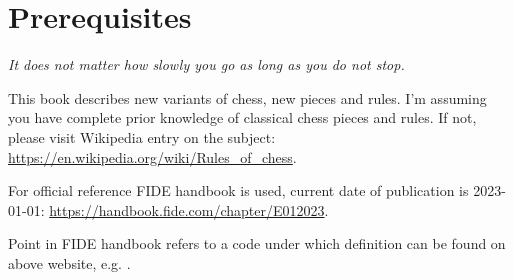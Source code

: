 

\chapter*{Prerequisites}
\label{ch:Prerequisites}

\begin{flushright}
\parbox{0.7\textwidth}{
\emph{It does not matter how slowly you go as long as you do not stop. \newline
{} } }
\end{flushright}

\noindent
This book describes new variants of chess, new pieces and rules. I'm assuming you
have complete prior knowledge of classical chess pieces and rules. If not, please
visit Wikipedia entry on the subject: \newline
\href{https://en.wikipedia.org/wiki/Rules\_of\_chess}{https://en.wikipedia.org/wiki/Rules\_of\_chess}.

For official reference FIDE handbook is used, current date of publication is 2023-01-01: \newline
\href{https://handbook.fide.com/chapter/E012023}{https://handbook.fide.com/chapter/E012023}.
\hypertarget{sec:Prerequisites/FIDE Handbook}{}

Point in FIDE handbook refers to a code under which definition can be found on above website,
e.g. .
\hypertarget{sec:Prerequisites/FIDE point}{}

\clearpage %
